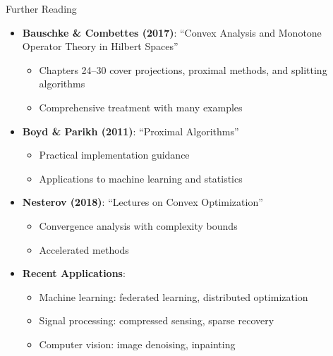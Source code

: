 \documentclass[aspectratio=169,10pt]{beamer}
\begin{document}
\begin{frame}{Further Reading}

    \begin{itemize}
        \item \textbf{Bauschke \& Combettes (2017)}: ``Convex Analysis and Monotone Operator Theory in Hilbert Spaces''
        \begin{itemize}
            \item Chapters 24--30 cover projections, proximal methods, and splitting algorithms
            \item Comprehensive treatment with many examples
        \end{itemize}

        \vspace{0.3cm}

        \item \textbf{Boyd \& Parikh (2011)}: ``Proximal Algorithms''
        \begin{itemize}
            \item Practical implementation guidance
            \item Applications to machine learning and statistics
        \end{itemize}

        \vspace{0.3cm}

        \item \textbf{Nesterov (2018)}: ``Lectures on Convex Optimization''
        \begin{itemize}
            \item Convergence analysis with complexity bounds
            \item Accelerated methods
        \end{itemize}

        \vspace{0.3cm}

        \item \textbf{Recent Applications}:
        \begin{itemize}
            \item Machine learning: federated learning, distributed optimization
            \item Signal processing: compressed sensing, sparse recovery
            \item Computer vision: image denoising, inpainting
        \end{itemize}
    \end{itemize}

\end{frame}
\end{document}
